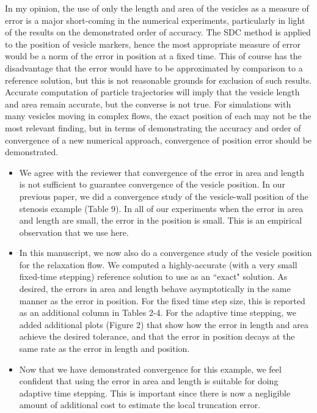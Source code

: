 \documentclass[12pt]{article}
\newcommand{\comment}[1]{{\color{blue} #1}}
\begin{document}
\comment{In my opinion, the use of only the length and area of the
vesicles as a measure of error is a major short-coming in the numerical
experiments, particularly in light of the results on the demonstrated
order of accuracy. The SDC method is applied to the position of vesicle
markers, hence the most appropriate measure of error would be a norm of
the error in position at a fixed time. This of course has the
disadvantage that the error would have to be approximated by comparison
to a reference solution, but this is not reasonable grounds for
exclusion of such results. Accurate computation of particle trajectories
will imply that the vesicle length and area remain accurate, but the
converse is not true. For simulations with many vesicles moving in
complex flows, the exact position of each may not be the most relevant
finding, but in terms of demonstrating the accuracy and order of
convergence of a new numerical approach, convergence of position error
should be demonstrated.}
\begin{itemize}
  \item We agree with the reviewer that convergence of the error in area
  and length is not sufficient to guarantee convergence of the vesicle
  position.  In our previous paper, we did a convergence study of the
  vesicle-wall position of the stenosis example (Table 9). In all of our
  experiments when the error in area and length are small, the error in
  the position is small. This is an empirical observation that we use
  here. 

  \item In this manuscript, we now also do a convergence study of the
  vesicle position for the relaxation flow.  We computed a
  highly-accurate (with a very small fixed-time stepping) reference
  solution to use as an ``exact" solution.  As desired, the errors in
  area and length behave asymptotically in the same manner as the error
  in position.  For the fixed time step size, this is reported as an
  additional column in Tables 2-4.  For the adaptive time stepping, we
  added additional plots (Figure 2) that show how the error in length
  and area achieve the desired tolerance, and that the error in
  position decays at the same rate as the error in length and position. 

  \item Now that we have demonstrated convergence for this example, we
  feel confident that using the error in area and length is suitable
  for doing adaptive time stepping.  This is important since there is
  now a negligible amount of additional cost to estimate the local
  truncation error.
\end{itemize}
\end{document}
